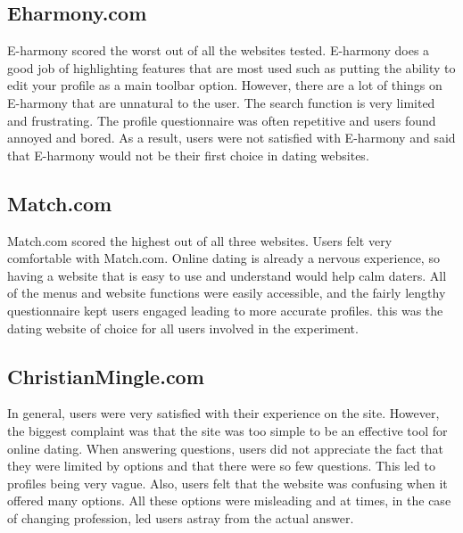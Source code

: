 \documentclass{article}
\begin{document}
\subsection{Eharmony.com}
E-harmony scored the worst out of all the websites tested. E-harmony does a good job of highlighting features that are most used such as putting the ability to edit your profile as a main toolbar option. However, there are a lot of things on E-harmony that are unnatural to the user. The search function is very limited and frustrating. The profile questionnaire was often repetitive and users found annoyed and bored. As a result, users were not satisfied with E-harmony and said that E-harmony would not be their first choice in dating websites.

\subsection{Match.com}
Match.com scored the highest out of all three websites. Users felt very comfortable with Match.com. Online dating is already a nervous experience, so having a website that is easy to use and understand would help calm daters. All of the menus and website functions were easily accessible, and the fairly lengthy questionnaire kept users engaged leading to more accurate profiles. this was the dating website of choice for all users involved in the experiment.

\subsection{ChristianMingle.com}
In general, users were very satisfied with their experience on the site. However, the biggest complaint was that the site was too simple to be an effective tool for online dating. When answering questions, users did not appreciate the fact that they were limited by options and that there were so few questions. This led to profiles being very vague. Also, users felt that the website was confusing when it offered many options. All these options were misleading and at times, in the case of changing profession, led users astray from the actual answer.


\pagebreak
%
%
\end{document}
